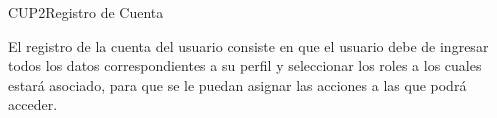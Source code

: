 \begin{UseCase}{CUP2}{Registro de Cuenta}
    {

    	
    	El registro de la cuenta del usuario consiste en que el usuario debe de ingresar todos los datos correspondientes a su perfil y seleccionar los roles a los cuales estará asociado, para que se le puedan asignar las acciones a las que podrá acceder.
    
    	
    }


\end{UseCase}
